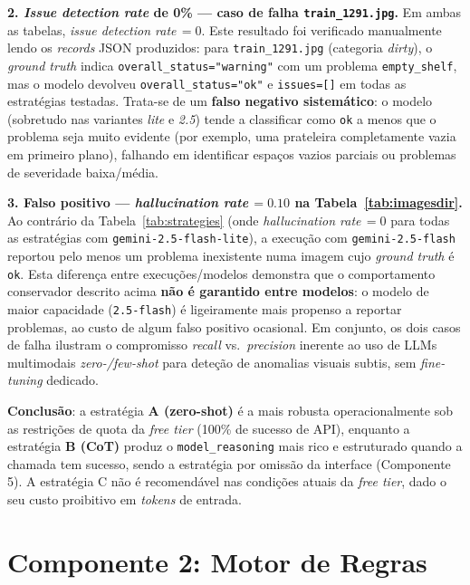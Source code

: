 \documentclass[conference]{IEEEtran}
\begin{document}
\textbf{2. \textit{Issue detection rate} de 0\% --- caso de falha
\texttt{train\_1291.jpg}.} Em ambas as tabelas, \textit{issue detection
rate}\,$=0$. Este resultado foi verificado manualmente lendo os
\textit{records} JSON produzidos: para \texttt{train\_1291.jpg} (categoria
\textit{dirty}), o \textit{ground truth} indica
\texttt{overall\_status="warning"} com um problema \texttt{empty\_shelf},
mas o modelo devolveu \texttt{overall\_status="ok"} e \texttt{issues=[]} em
todas as estratégias testadas. Trata-se de um \textbf{falso negativo
sistemático}: o modelo (sobretudo nas variantes \textit{lite} e \textit{2.5})
tende a classificar como \texttt{ok} a menos que o problema seja muito
evidente (por exemplo, uma prateleira completamente vazia em primeiro
plano), falhando em identificar espaços vazios parciais ou problemas de
severidade baixa/média.

\textbf{3. Falso positivo --- \textit{hallucination rate}\,$=0.10$ na
Tabela~\ref{tab:imagesdir}.} Ao contrário da Tabela~\ref{tab:strategies}
(onde \textit{hallucination rate}\,$=0$ para todas as estratégias com
\texttt{gemini-2.5-flash-lite}), a execução com \texttt{gemini-2.5-flash}
reportou pelo menos um problema inexistente numa imagem cujo \textit{ground
truth} é \texttt{ok}. Esta diferença entre execuções/modelos demonstra que o
comportamento conservador descrito acima \textbf{não é garantido entre
modelos}: o modelo de maior capacidade (\texttt{2.5-flash}) é ligeiramente
mais propenso a reportar problemas, ao custo de algum falso positivo
ocasional. Em conjunto, os dois casos de falha ilustram o compromisso
\textit{recall} vs.\ \textit{precision} inerente ao uso de LLMs
multimodais \textit{zero-/few-shot} para deteção de anomalias visuais
subtis, sem \textit{fine-tuning} dedicado.

\textbf{Conclusão}: a estratégia \textbf{A (zero-shot)} é a mais robusta
operacionalmente sob as restrições de quota da \textit{free tier} (100\% de
sucesso de API), enquanto a estratégia \textbf{B (CoT)} produz o
\texttt{model\_reasoning} mais rico e estruturado quando a chamada tem
sucesso, sendo a estratégia por omissão da interface (Componente 5). A
estratégia C não é recomendável nas condições atuais da \textit{free tier},
dado o seu custo proibitivo em \textit{tokens} de entrada.

\section{Componente 2: Motor de Regras}
\label{sec:rules}
\end{document}
